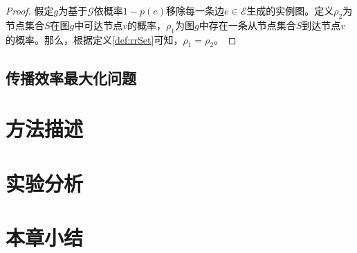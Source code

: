 \begin{proof}
假定$g$为基于$\mathcal{G}$依概率$1-p\left(e\right)$移除每一条边$e \in \mathcal{E}$生成的实例图。定义$\rho_2$为节点集合$S$在图$g$中可达节点$v$的概率，$\rho_1$为图$g$中存在一条从节点集合$S$到达节点$v$的概率。那么，根据定义\ref{def:rrSet}可知，$\rho_1 = \rho_2$。
\end{proof}

\subsection{传播效率最大化问题}
\label{3subsec:efficiency}

\section{方法描述}
\label{3sec:method}

\section{实验分析}
\label{3sec:experiment}

\section{本章小结}
\label{3sec:conclusion}

